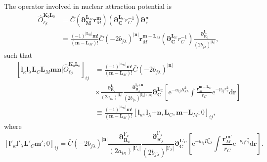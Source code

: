 \documentclass[a4paper,11pt,twoside,openright]{book}
\begin{document}
The operator involved in nuclear attraction potential is
\begin{align}
  \hat{O}_{\ell_{\beta}}^{\boldsymbol{K}_{0}\boldsymbol{L}_{0}}%
  &=\bar{C}\left(\boldsymbol{\partial}_{\boldsymbol{M}}^{\boldsymbol{L}_{M}}\boldsymbol{r}_{M}^{\boldsymbol{m}}\right)%
    \left(\boldsymbol{\partial}_{\boldsymbol{C}}^{\boldsymbol{L}_{C}}r_{C}^{-1}\right)%
    \boldsymbol{\partial}_{\boldsymbol{r}}^{\boldsymbol{n}}\\
  &=\frac{(-1)^{|\boldsymbol{L}_{M}|}\boldsymbol{m}!}{(\boldsymbol{m}-\boldsymbol{L}_{M})!}%
    \bar{C}(-2b_{j\lambda})^{|\boldsymbol{n}|}%
    \boldsymbol{r}_{M}^{\boldsymbol{m}-\boldsymbol{L}_{M}}%
    \left(\boldsymbol{\partial}_{\boldsymbol{C}}^{\boldsymbol{L}_{C}}r_{C}^{-1}\right)%
    \frac{\boldsymbol{\partial}_{\boldsymbol{R}_{\lambda}}^{\boldsymbol{l}_{\lambda}}}%
      {(2b_{j\lambda})^{|\boldsymbol{l}_{\lambda}|}},\nonumber
\end{align}
such that
\begin{align}
  \left[\boldsymbol{l}_{\kappa}\boldsymbol{l}_{\lambda}\boldsymbol{L}_{C}%
    \boldsymbol{L}_{M}\boldsymbol{m}\boldsymbol{n}\Big|%
    \hat{O}_{\ell_{\beta}}^{\boldsymbol{K}_{0}\boldsymbol{L}_{0}}\right]_{ij}
  &=\frac{(-1)^{|\boldsymbol{L}_{M}|}\boldsymbol{m}!}{(\boldsymbol{m}-\boldsymbol{L}_{M})!}%
    \bar{C}(-2b_{j\lambda})^{|\boldsymbol{n}|}\\
  &\times\frac{\boldsymbol{\partial}_{\boldsymbol{R}_{\kappa}}^{\boldsymbol{l}_{\kappa}}}%
      {(2a_{i\kappa})^{|\boldsymbol{l}_{\kappa}|}}%
    \frac{\boldsymbol{\partial}_{\boldsymbol{R}_{\lambda}}^{\boldsymbol{l}_{\lambda}\mathrm{+}\boldsymbol{n}}}%
      {(2b_{j\lambda})^{|\boldsymbol{l}_{\lambda}|\mathrm{+}|\boldsymbol{n}|}}%
    \boldsymbol{\partial}_{\boldsymbol{C}}^{\boldsymbol{L}_{C}}%
    \left[\mathrm{e}^{-u_{ij}R_{\kappa\lambda}^2}\int%
      \frac{\boldsymbol{r}_{M}^{\boldsymbol{m}-\boldsymbol{L}_{M}}}{r_{C}}%
        \mathrm{e}^{-p_{ij}r_{\gamma}^2}\mathrm{d}\boldsymbol{r}\right]\nonumber\\
  &\equiv\frac{(-1)^{|\boldsymbol{L}_{M}|}\boldsymbol{m}!}{(\boldsymbol{m}-\boldsymbol{L}_{M})!}%
    \left[\boldsymbol{l}_{\kappa},\boldsymbol{l}_{\lambda}\mathrm{+}\boldsymbol{n},%
    \boldsymbol{L}_{C},\boldsymbol{m}\mathrm{-}\boldsymbol{L}_{M};0\right]_{ij},\nonumber
\end{align}
where
\begin{equation}
  \left[\boldsymbol{l}'_{\kappa}\boldsymbol{l}'_{\lambda}\boldsymbol{L}'_{C}\boldsymbol{m}';0\right]_{ij}
  =\bar{C}(-2b_{j\lambda})^{|\boldsymbol{n}|}%
    \frac{\boldsymbol{\partial}_{\boldsymbol{R}_{\kappa}}^{\boldsymbol{l}'_{\kappa}}}%
      {(2a_{i\kappa})^{|\boldsymbol{l}'_{\kappa}|}}%
    \frac{\boldsymbol{\partial}_{\boldsymbol{R}_{\lambda}}^{\boldsymbol{l}'_{\lambda}}}%
      {(2b_{j\lambda})^{|\boldsymbol{l}'_{\lambda}|}}%
    \boldsymbol{\partial}_{\boldsymbol{C}}^{\boldsymbol{L}'_{C}}%
    \left[\mathrm{e}^{-u_{ij}R_{\kappa\lambda}^2}\int%
      \frac{\boldsymbol{r}_{M}^{\boldsymbol{m}'}}{r_{C}}%
        \mathrm{e}^{-p_{ij}r_{\gamma}^2}\mathrm{d}\boldsymbol{r}\right].
\end{equation}
\end{document}
